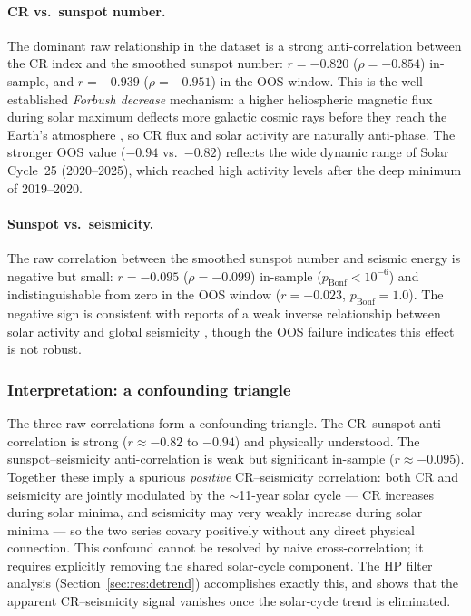 \documentclass[12pt,a4paper]{article}
\begin{document}
\paragraph{CR vs.\ sunspot number.}
The dominant raw relationship in the dataset is a strong anti-correlation
between the CR index and the smoothed sunspot number: $r = -0.820$
($\rho = -0.854$) in-sample, and $r = -0.939$ ($\rho = -0.951$) in the OOS
window.
This is the well-established \emph{Forbush decrease} mechanism: a higher
heliospheric magnetic flux during solar maximum deflects more galactic cosmic
rays before they reach the Earth's atmosphere
\citep{Potgieter2013}, so CR flux and solar activity are naturally anti-phase.
The stronger OOS value ($-0.94$ vs.\ $-0.82$) reflects the wide dynamic range
of Solar Cycle~25 (2020--2025), which reached high activity levels after the
deep minimum of 2019--2020.

\paragraph{Sunspot vs.\ seismicity.}
The raw correlation between the smoothed sunspot number and seismic energy is
negative but small: $r = -0.095$ ($\rho = -0.099$) in-sample
($p_\text{Bonf} < 10^{-6}$) and indistinguishable from zero in the OOS window
($r = -0.023$, $p_\text{Bonf} = 1.0$).
The negative sign is consistent with reports of a weak inverse relationship
between solar activity and global seismicity
\citep{Odintsov2006}, though the OOS failure indicates this effect is not
robust.

\subsubsection{Interpretation: a confounding triangle}

The three raw correlations form a confounding triangle.
The CR--sunspot anti-correlation is strong ($r \approx -0.82$ to $-0.94$)
and physically understood.
The sunspot--seismicity anti-correlation is weak but significant in-sample
($r \approx -0.095$).
Together these imply a spurious \emph{positive} CR--seismicity correlation:
both CR and seismicity are jointly modulated by the $\sim$11-year solar cycle
--- CR increases during solar minima, and seismicity may very weakly increase
during solar minima --- so the two series covary positively without any direct
physical connection.
This confound cannot be resolved by naive cross-correlation; it requires
explicitly removing the shared solar-cycle component.
The HP filter analysis (Section~\ref{sec:res:detrend}) accomplishes exactly
this, and shows that the apparent CR--seismicity signal vanishes once the
solar-cycle trend is eliminated.
\end{document}
